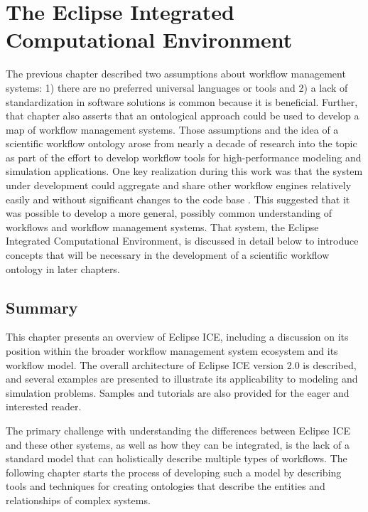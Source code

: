 \chapter{The Eclipse Integrated Computational Environment} \label{ch:eclipse-ice}

The previous chapter described two assumptions about workflow management
systems: 1) there are no preferred universal languages or tools
and 2) a lack of standardization in software solutions is common because it is
beneficial. Further, that chapter also asserts that an ontological approach
could be used to develop a map of workflow management systems. Those assumptions
and the idea of a scientific workflow ontology arose from nearly a decade of
research into the topic as part of the effort to develop workflow tools for
high-performance modeling and simulation applications. One key realization
during this work was that the system under development could aggregate and share
other workflow engines relatively easily and without significant changes to the
code base \cite{brooks_introducing_2016}. This suggested that it was possible
to develop a more general, possibly common understanding of workflows and
workflow management systems. That system, the Eclipse Integrated Computational
Environment, is discussed in detail below to introduce concepts that will be
necessary in the development of a scientific workflow ontology in later
chapters.


\section{Summary}

This chapter presents an overview of Eclipse ICE, including a discussion on its
position within the broader workflow management system ecosystem and its
workflow model. The overall architecture of Eclipse ICE version 2.0 is
described, and several examples are presented to illustrate its applicability
to modeling and simulation problems. Samples and tutorials are also provided
for the eager and interested reader.


The primary challenge with understanding the differences between Eclipse ICE and
these other systems, as well as how they can be integrated, is the lack of a
standard model that can holistically describe multiple types of workflows. The
following chapter starts the process of developing such a model by
describing tools and techniques for creating ontologies that describe the
entities and relationships of complex systems.
